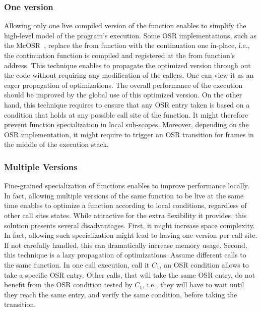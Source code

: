 \subsubsection{One version}
Allowing only one live compiled version of the function enables to simplify the high-level model of the program's execution.
Some OSR implementations, such as the McOSR~\cite{lameed2013modular}, replace the from function with the continuation one in-place, i.e., the continuation function is compiled and registered at the from function's address.
This technique enables to propagate the optimized version through out the code without requiring any modification of the callers.
One can view it as an eager propagation of optimizations.
The overall performance of the execution should be improved by the global use of this optimized version.
On the other hand, this technique requires to ensure that any OSR entry taken is based on a condition that holds at any possible call site of the function.
It might therefore prevent function specialization in local sub-scopes.
Moreover, depending on the OSR implementation, it might require to trigger an OSR transition for frames in the middle of the execution stack.
\\


\subsubsection{Multiple Versions}
Fine-grained specialization of functions enables to improve performance locally.
In fact, allowing multiple versions of the same function to be live at the same time enables to optimize a function according to local conditions, regardless of other call sites states.
While attractive for the extra flexibility it provides, this solution presents several disadvantages.
First, it might increase space complexity.
In fact, allowing such specialization might lead to having one version per call site.
If not carefully handled, this can dramatically increase memory usage.
Second, this technique is a lazy propagation of optimizations.
Assume different calls to the same function.
In one call execution, call it $C_1$, an OSR condition allows to take a specific OSR entry.
Other calls, that will take the same OSR entry, do not benefit from the OSR condition tested by $C_1$, i.e., they will have to wait until they reach the same entry, and verify the same condition, before taking the transition.




